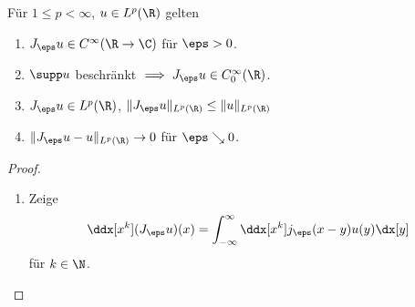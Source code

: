 \begin{st} \label{4.20}
	Für $1 \le p < \infty$, $u \in L^p(\R)$ gelten
	\begin{enumerate}[1)]
		\item
			$J_\eps u \in C^\infty (\R \to \C)$ für $\eps > 0$.
		\item
			$\supp u$ beschränkt $\implies J_\eps u \in C_0^\infty (\R)$.
		\item
			$J_\eps u \in L^p(\R)$, $\|J_\eps u \|_{L^p(\R)} \le \|u\|_{L^p(\R)}$
		\item
			$\|J_\eps u - u \|_{L^p(\R)} \to 0$ für $\eps \searrow 0$.
	\end{enumerate}
	\begin{proof}
		\begin{enumerate}[1)]
			\item
				Zeige
				\[
					\ddx[x^k] (J_\eps u)(x) = \int_{-\infty}^\infty \ddx[x^k] j_\eps (x-y) u(y) \dx[y]
				\]
				für $k \in \N$.


\end{enumerate}
\end{proof}
\end{st}
